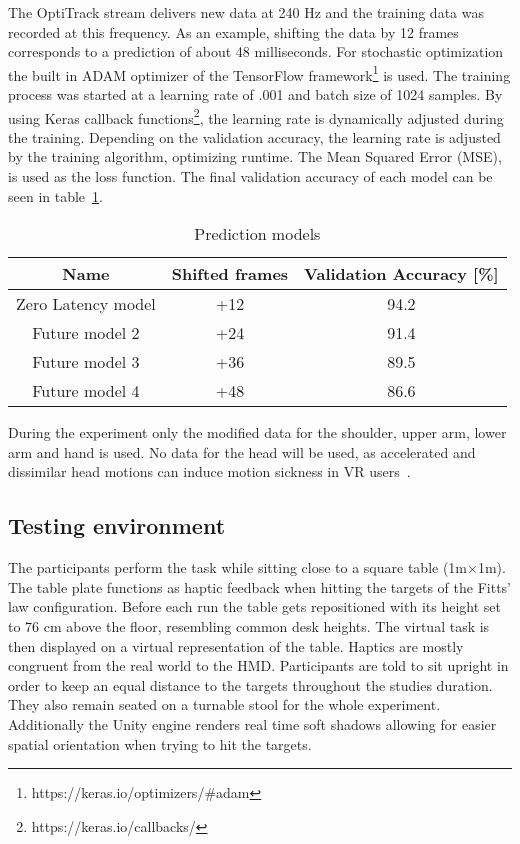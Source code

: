 \documentclass[sigconf]{acmart}
\begin{document}
The OptiTrack stream delivers new data at 240 Hz and the training data was recorded at this frequency. As an example, shifting the data by 12 frames corresponds to a prediction of about 48 milliseconds. For stochastic optimization the built in ADAM optimizer\cite{Kingma2015} of the TensorFlow framework\footnote{https://keras.io/optimizers/\#adam} is used. The training process was started at a learning rate of .001 and batch size of 1024 samples. By using Keras callback functions\footnote{https://keras.io/callbacks/}, the learning rate is dynamically adjusted during the training. Depending on the validation accuracy, the learning rate is adjusted by the training algorithm, optimizing runtime. The Mean Squared Error (MSE), is used as the loss function. The final validation accuracy of each model can be seen in table~\ref{table:AccuracyTable}.

\begin{table}
\caption{Prediction models}
\label{table:AccuracyTable}
\begin{tabular}{ccc} 
\hline
Name & Shifted frames & Validation Accuracy [\%] \\
\hline
Zero Latency model 	& +12 & 94.2 \\
Future model 2 		& +24 & 91.4 \\
Future model 3 		& +36 & 89.5 \\
Future model 4 		& +48 & 86.6 \\ \hline
\end{tabular}
\end{table}

During the experiment only the modified data for the shoulder, upper arm, lower arm and hand is used. No data for the head will be used, as accelerated and dissimilar head motions can induce motion sickness in VR users~\cite{Akiduki2003}.

\subsection{Testing environment}
The participants perform the task while sitting close to a square table (1m$\times$1m). The table plate functions as haptic feedback when hitting the targets of the Fitts' law configuration. Before each run the table gets repositioned with its height set to 76 cm above the floor, resembling common desk heights. The virtual task is then displayed on a virtual representation of the table. Haptics are mostly congruent from the real world to the HMD. Participants are told to sit upright in order to keep an equal distance to the targets throughout the studies duration. They also remain seated on a turnable stool for the whole experiment. Additionally the Unity engine renders real time soft shadows allowing for easier spatial orientation when trying to hit the targets. 
\end{document}
